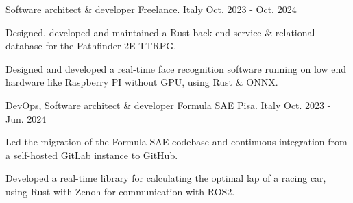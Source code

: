 

\begin{cventries}

  \cventry
    {Software architect \& developer} %
    {Freelance.} %
    {Italy} %
    {Oct. 2023 - Oct. 2024} %
    {
      \begin{cvitems} %
        \item {Designed, developed and maintained a Rust back-end service \& relational database for the Pathfinder 2E TTRPG.}
        \item {Designed and developed a real-time face recognition software running on low end hardware like Raspberry PI without GPU, using Rust \& ONNX.}
      \end{cvitems}
    }
    

  \cventry
    {DevOps, Software architect \& developer} %
    {Formula SAE Pisa.} %
    {Italy} %
    {Oct. 2023 - Jun. 2024} %
    {
      \begin{cvitems} %
        \item {Led the migration of the Formula SAE codebase and continuous integration from a self-hosted GitLab instance to GitHub.}
        \item {Developed a real-time library for calculating the optimal lap of a racing car, using Rust with Zenoh for communication with ROS2.}
      \end{cvitems}
    }
    

\end{cventries}
